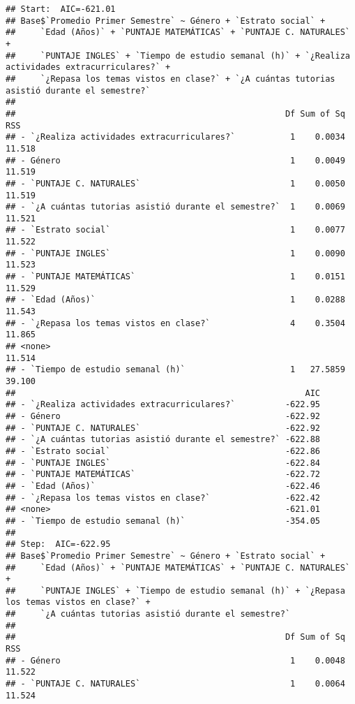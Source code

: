 \documentclass[
  man]{apa6}
\begin{document}
\begin{verbatim}
## Start:  AIC=-621.01
## Base$`Promedio Primer Semestre` ~ Género + `Estrato social` + 
##     `Edad (Años)` + `PUNTAJE MATEMÁTICAS` + `PUNTAJE C. NATURALES` + 
##     `PUNTAJE INGLES` + `Tiempo de estudio semanal (h)` + `¿Realiza actividades extracurriculares?` + 
##     `¿Repasa los temas vistos en clase?` + `¿A cuántas tutorias asistió durante el semestre?`
## 
##                                                      Df Sum of Sq    RSS
## - `¿Realiza actividades extracurriculares?`           1    0.0034 11.518
## - Género                                              1    0.0049 11.519
## - `PUNTAJE C. NATURALES`                              1    0.0050 11.519
## - `¿A cuántas tutorias asistió durante el semestre?`  1    0.0069 11.521
## - `Estrato social`                                    1    0.0077 11.522
## - `PUNTAJE INGLES`                                    1    0.0090 11.523
## - `PUNTAJE MATEMÁTICAS`                               1    0.0151 11.529
## - `Edad (Años)`                                       1    0.0288 11.543
## - `¿Repasa los temas vistos en clase?`                4    0.3504 11.865
## <none>                                                            11.514
## - `Tiempo de estudio semanal (h)`                     1   27.5859 39.100
##                                                          AIC
## - `¿Realiza actividades extracurriculares?`          -622.95
## - Género                                             -622.92
## - `PUNTAJE C. NATURALES`                             -622.92
## - `¿A cuántas tutorias asistió durante el semestre?` -622.88
## - `Estrato social`                                   -622.86
## - `PUNTAJE INGLES`                                   -622.84
## - `PUNTAJE MATEMÁTICAS`                              -622.72
## - `Edad (Años)`                                      -622.46
## - `¿Repasa los temas vistos en clase?`               -622.42
## <none>                                               -621.01
## - `Tiempo de estudio semanal (h)`                    -354.05
## 
## Step:  AIC=-622.95
## Base$`Promedio Primer Semestre` ~ Género + `Estrato social` + 
##     `Edad (Años)` + `PUNTAJE MATEMÁTICAS` + `PUNTAJE C. NATURALES` + 
##     `PUNTAJE INGLES` + `Tiempo de estudio semanal (h)` + `¿Repasa los temas vistos en clase?` + 
##     `¿A cuántas tutorias asistió durante el semestre?`
## 
##                                                      Df Sum of Sq    RSS
## - Género                                              1    0.0048 11.522
## - `PUNTAJE C. NATURALES`                              1    0.0064 11.524

\end{verbatim}
\end{document}
